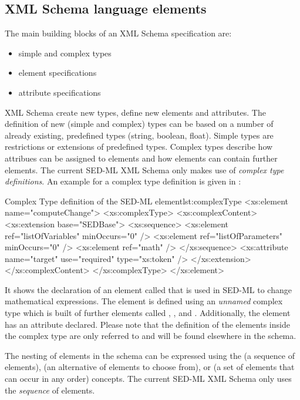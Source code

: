 \subsection{XML Schema language elements}
The main building blocks of an XML Schema specification are:
\begin{itemize}
\item {simple and complex types}
\item {element specifications}
\item {attribute specifications}
\end{itemize}
XML Schema  create new types,  define new elements and attributes.
The definition of new (simple and complex) types can be based on a number of already existing, predefined types (string, boolean, float). Simple types are restrictions or extensions of predefined types. Complex types describe how attribues can be assigned to elements and how elements can contain further elements. The current SED-ML XML Schema only makes use of \emph{complex type definitions}.
An example for a complex type definition is given in :
%
\begin{myXmlLst}{Complex Type definition of the SED-ML  element}{lst:complexType}
<xs:element name="computeChange">
	<xs:complexType>
		<xs:complexContent>
			<xs:extension base="SEDBase">
				<xs:sequence>
					<xs:element ref="listOfVariables" minOccurs="0" />
					<xs:element ref="listOfParameters" minOccurs="0" />
					<xs:element ref="math" />
				</xs:sequence>
				<xs:attribute name="target" use="required" type="xs:token" />
			</xs:extension>
		</xs:complexContent>
	</xs:complexType>
</xs:element>
\end{myXmlLst}
%
It shows the declaration of an element called  that is used in SED-ML to change mathematical expressions. The element is defined using an \emph{unnamed} complex type which is built of further elements called , , and . 
Additionally, the element  has an attribute  declared. Please note that the definition of the elements inside the complex type are only referred to and will be found elsewhere in the schema.

The nesting of elements in the schema can be expressed using the  (a sequence of elements),  (an alternative of elements to choose from), or  (a set of elements that can occur in any order) concepts. The current SED-ML XML Schema only uses the \emph{sequence} of elements. 

